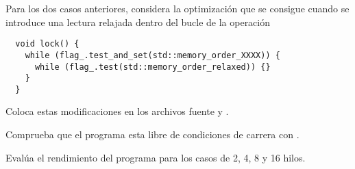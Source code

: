 Para los dos casos anteriores, considera la optimización que se consigue cuando se introduce
una lectura relajada dentro del bucle de la operación 

\begin{lstlisting}
  void lock() {
    while (flag_.test_and_set(std::memory_order_XXXX)) {
      while (flag_.test(std::memory_order_relaxed)) {}
    }
  }
\end{lstlisting}

Coloca estas modificaciones en los archivos fuente  y 
.

Comprueba que el programa esta libre de condiciones de carrera con .

Evalúa el rendimiento del programa para los casos de 2, 4, 8 y 16 hilos.

